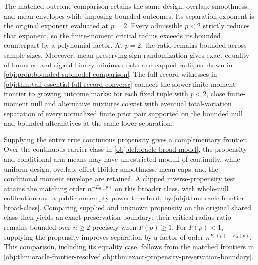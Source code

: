 \documentclass[11pt]{article}
\begin{document}
The matched outcome comparison retains the same design, overlap, smoothness, and mean envelopes while imposing bounded outcomes. Its separation exponent is the original exponent evaluated at \(p=2\). Every admissible \(p<2\) strictly reduces that exponent, so the finite-moment critical radius exceeds its bounded counterpart by a polynomial factor. At \(p=2\), the ratio remains bounded across sample sizes. Moreover, mean-preserving sign randomization gives exact equality of bounded and signed-binary minimax risks and capped radii, as shown in \cref{obj:prop:bounded-submodel-comparison}. The full-record witnesses in \cref{obj:thm:tail-essential-full-record-converse} connect the slower finite-moment frontier to growing outcome marks: for each fixed tuple with \(p<2\), close finite-moment null and alternative mixtures coexist with eventual total-variation separation of every normalized finite prior pair supported on the bounded null and bounded alternatives at the same lower separation.

Supplying the entire true continuous propensity gives a complementary frontier. Over the continuous-carrier class in \cref{obj:def:oracle-broad-model}, the propensity and conditional arm means may have unrestricted moduli of continuity, while uniform design, overlap, effect Hölder smoothness, mean caps, and the conditional moment envelope are retained. A clipped inverse-propensity test attains the matching order \(n^{-E_0(p)}\) on this broader class, with whole-null calibration and a public nonempty-power threshold, by \cref{obj:thm:oracle-frontier-broad-class}. Comparing supplied and unknown propensity on the original shared class then yields an exact preservation boundary: their critical-radius ratio remains bounded over \(n\ge2\) precisely when \(F(p)\ge1\). For \(F(p)<1\), supplying the propensity improves separation by a factor of order \(n^{E_0(p)-E_4(p)}\). This comparison, including its equality case, follows from the matched frontiers in \cref{obj:thm:oracle-frontier-resolved,obj:thm:exact-propensity-preservation-boundary}.
\end{document}
